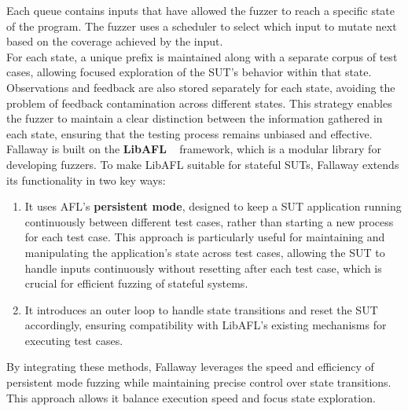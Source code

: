 Each queue contains inputs that have allowed the fuzzer to reach a specific state of the program. The fuzzer uses a scheduler to select which input to mutate next based on the coverage achieved by the input.
\\For each state, a unique prefix is maintained along with a separate corpus of test cases, allowing focused exploration of the SUT's behavior within that state. Observations and feedback are also stored separately for each state, avoiding the problem of feedback contamination across different states. This strategy enables the fuzzer to maintain a clear distinction between the information gathered in each state, ensuring that the testing process remains unbiased and effective.
\\Fallaway is built on the \textbf{LibAFL} ~\cite{libafl} framework, which is a modular library for developing fuzzers. To make LibAFL suitable for stateful SUTs, Fallaway extends its functionality in two key ways:
\begin{enumerate}
    \item It uses AFL's \textbf{persistent mode}, designed to keep a SUT application running continuously between different test cases, rather than starting a new process for each test case. This approach is particularly useful for maintaining and manipulating the application's state across test cases, allowing the SUT to handle inputs continuously without resetting after each test case, which is crucial for efficient fuzzing of stateful systems.
    \item It introduces an outer loop to handle state transitions and reset the SUT accordingly, ensuring compatibility with LibAFL's existing mechanisms for executing test cases.
\end{enumerate}  
By integrating these methods, Fallaway leverages the speed and efficiency of persistent mode fuzzing while maintaining precise control over state transitions. This approach allows it balance execution speed and focus state exploration.
